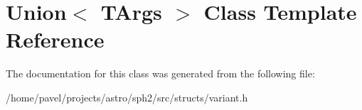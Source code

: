 \hypertarget{classUnion}{}\section{Union$<$ T\+Args $>$ Class Template Reference}
\label{classUnion}


The documentation for this class was generated from the following file\+:\begin{DoxyCompactItemize}
\item 
/home/pavel/projects/astro/sph2/src/structs/variant.\+h\end{DoxyCompactItemize}
